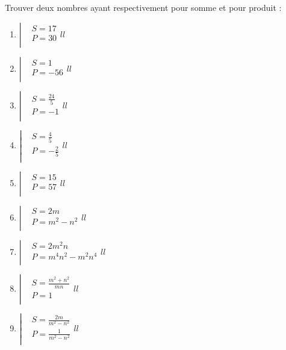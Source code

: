 \begin{exercice}
Trouver deux nombres ayant respectivement pour somme et pour produit :
\begin{multicols}{2}
\begin{enumerate}
\item $\left| \begin{array}{ll}
  & S=17 \\ 
 & P=30 \\ 
\end{array}{ll} \right.$ 
\item $\left| \begin{array}{ll}
  & S=1 \\ 
 & P=-56 \\ 
\end{array}{ll} \right.$ 
\item $\left| \begin{array}{ll}
  & S=\frac{24}{5} \\ 
 & P=-1 \\ 
\end{array}{ll} \right.$ 
\item $\left| \begin{array}{ll}
  & S=\frac{4}{5} \\ 
 & P=-\frac{2}{5} \\ 
\end{array}{ll} \right.$
\item $\left| \begin{array}{ll}
  & S=15 \\ 
 & P=57 \\ 
\end{array}{ll} \right.$
\item $\left| \begin{array}{ll}
  & S=2m \\ 
 & P={{m}^{2}}-{{n}^{2}} \\ 
\end{array}{ll} \right.$
\item $\left| \begin{array}{ll}
  & S=2{{m}^{2}}n \\ 
 & P={{m}^{4}}{{n}^{2}}-{{m}^{2}}{{n}^{4}} \\ 
\end{array}{ll} \right.$
\item $\left| \begin{array}{ll}
  & S=\frac{{{m}^{2}}+{{n}^{2}}}{mn} \\ 
 & P=1 \\ 
\end{array}{ll} \right.$
\item $\left| \begin{array}{ll}
  & S=\frac{2m}{{{m}^{2}}-{{n}^{2}}} \\ 
 & P=\frac{1}{{{m}^{2}}-{{n}^{2}}} \\ 
\end{array}{ll} \right.$
\end{enumerate}
\end{multicols}
\end{exercice}

